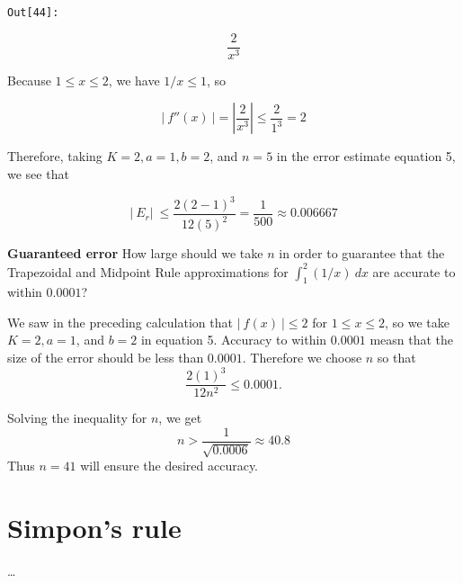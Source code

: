 \documentclass[11pt]{article}
\def\gt{>}
\begin{document}
\texttt{\color{outcolor}Out[{\color{outcolor}44}]:}
    
    $$\frac{2}{x^{3}}$$

    

    Because \(1 \leq x \leq 2\), we have \(1/x \leq 1\), so

\[ |\ f''(x)\ | = \left|\dfrac{2}{x^3}\right| \leq \dfrac{2}{1^3}=2 \]

    Therefore, taking \(K=2,a=1,b=2\), and \(n=5\) in the error estimate
equation 5, we see that

\[ |\ E_r |\ \leq \dfrac{2(2-1)^3}{12(5)^2}=\dfrac{1}{500}\approx0.006667 \]

    \textbf{Guaranteed error} How large should we take \(n\) in order to
guarantee that the Trapezoidal and Midpoint Rule approximations for
\(\int_1^2(1/x)\ dx\) are accurate to within \(0.0001\)?

    We saw in the preceding calculation that \(|\ f(x)\ | \leq 2\) for
\(1\leq x\leq 2\), so we take \(K=2, a=1\), and \(b=2\) in equation 5.
Accuracy to within \(0.0001\) measn that the size of the error should be
less than \(0.0001\). Therefore we choose \(n\) so that
\[ \dfrac{2(1)^3}{12n^2}\leq0.0001.\]

Solving the inequality for \(n\), we get
\[ n \gt \dfrac{1}{\sqrt{0.0006}}\approx 40.8 \] Thus \(n=41\) will
ensure the desired accuracy.

    \hypertarget{simpons-rule}{%
\section{Simpon's rule}\label{simpons-rule}}

    \ldots{}


    
    
    
    
\end{document}
